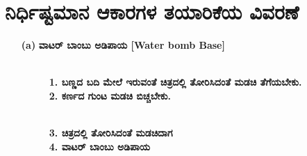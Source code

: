 \section{ನಿರ್ಧಿಷ್ಟಮಾನ ಆಕಾರಗಳ ತಯಾರಿಕೆಯ ವಿವರಣೆ}
\begin{enumerate}
\item[{\bf (a)}] \textbf{ವಾಟರ್ ಬಾಂಬು ಅಡಿಪಾಯ  [Water bomb Base]}
\begin{figure}[H]
\end{figure}
\begin{figure}[H]
\\
\textbf{1. ಬಣ್ಣದ ಬದಿ ಮೇಲೆ ಇರುವಂತೆ ಚಿತ್ರದಲ್ಲಿ ತೋರಿಸಿದಂತೆ ಮಡಚಿ ತೆಗೆಯಬೇಕು.}\\
\textbf{2. ಕರ್ಣದ ಗುಂಟ ಮಡಚಿ ಬಿಚ್ಚಬೇಕು.}
\end{figure}
\begin{figure}[H]
\\
\textbf{3. ಚಿತ್ರದಲ್ಲಿ ತೋರಿಸಿದಂತೆ ಮಡಚಿದಾಗ}\\
\textbf{4. ವಾಟರ್ ಬಾಂಬು ಅಡಿಪಾಯ}
\end{figure}



\end{enumerate}
